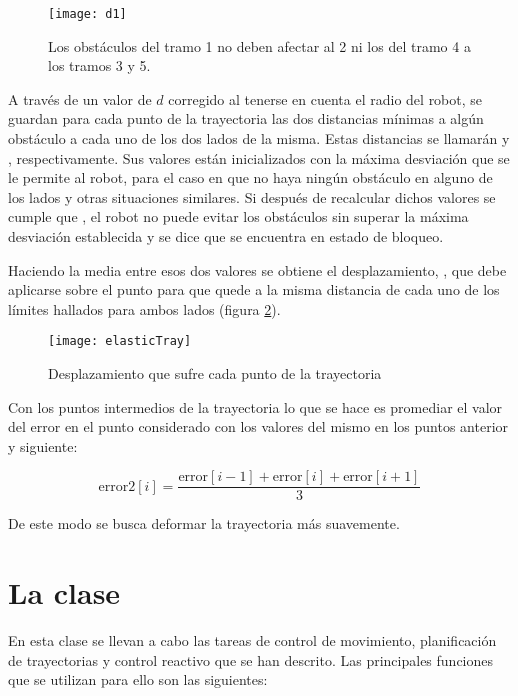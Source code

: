 \begin{figure}[hbt]
  \centering\texttt{[image: d1]}\\
  \caption{Los obstáculos del tramo 1 no deben afectar al 2 ni los del tramo 4 a los tramos 3 y 5.}\label{fg:d1}
\end{figure}

A través de un valor de $d$ corregido al tenerse en cuenta el radio del robot, se guardan para cada punto de la trayectoria las dos distancias mínimas a algún obstáculo a cada uno de los dos lados de la misma. Estas distancias se llamarán  y , respectivamente. Sus valores están inicializados con la máxima desviación que se le permite al robot, para el caso en que no haya ningún obstáculo en alguno de los lados y otras situaciones similares. Si después de recalcular dichos valores se cumple que , el robot no puede evitar los obstáculos sin superar la máxima desviación establecida y se dice que se encuentra en estado de bloqueo.

Haciendo la media entre esos dos valores se obtiene el desplazamiento, , que debe aplicarse sobre el punto para que quede a la misma distancia de cada uno de los límites hallados para ambos lados (figura \ref{fg:elasticTray}).

\begin{figure}[htb]
  \centering\texttt{[image: elasticTray]}\\
  \caption{Desplazamiento que sufre cada punto de la trayectoria}\label{fg:elasticTray}
\end{figure}

\pagebreak
Con los puntos intermedios de la trayectoria lo que se hace es promediar el valor del error en el punto considerado con los valores del mismo en los puntos anterior y siguiente:

\[  \mbox{error2}[i] = \frac{\mbox{error}[i-1] + \mbox{error}[i] + \mbox{error}[i+1]}{3} \]

\noindent
De este modo se busca deformar la trayectoria más suavemente.

\section{La clase }

En esta clase se llevan a cabo las tareas de control de movimiento, planificación de trayectorias y control reactivo que se han descrito. Las principales funciones que se utilizan para ello son las siguientes:

